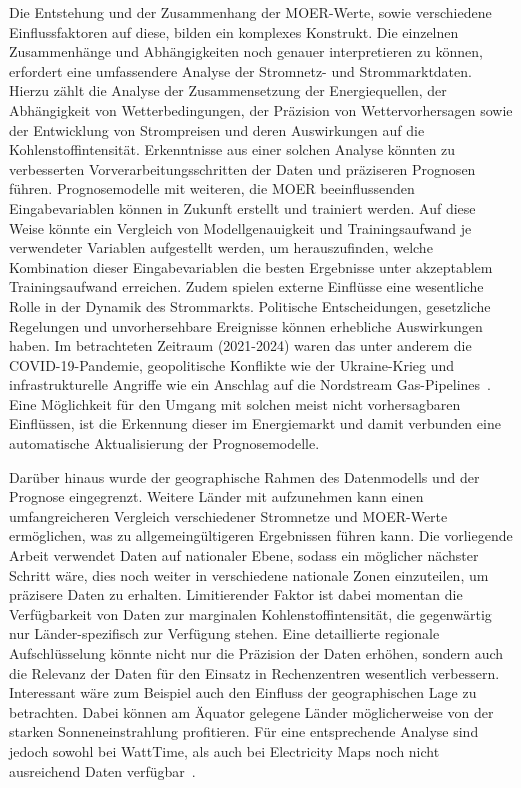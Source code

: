 Die Entstehung und der Zusammenhang der \ac{MOER}-Werte, sowie verschiedene Einflussfaktoren auf diese, bilden ein komplexes Konstrukt.
Die einzelnen Zusammenhänge und Abhängigkeiten noch genauer interpretieren zu können, erfordert eine umfassendere Analyse der Stromnetz- und Strommarktdaten.
Hierzu zählt die Analyse der Zusammensetzung der Energiequellen, der Abhängigkeit von Wetterbedingungen, der Präzision von Wettervorhersagen sowie der Entwicklung von Strompreisen und deren Auswirkungen auf die Kohlenstoffintensität.
Erkenntnisse aus einer solchen Analyse könnten zu verbesserten Vorverarbeitungsschritten der Daten und präziseren Prognosen führen.
Prognosemodelle mit weiteren, die \ac{MOER} beeinflussenden Eingabevariablen können in Zukunft erstellt und trainiert werden.
Auf diese Weise könnte ein Vergleich von Modellgenauigkeit und Trainingsaufwand je verwendeter Variablen aufgestellt werden, um herauszufinden, welche Kombination dieser Eingabevariablen die besten Ergebnisse unter akzeptablem Trainingsaufwand erreichen.
Zudem spielen externe Einflüsse eine wesentliche Rolle in der Dynamik des Strommarkts.
Politische Entscheidungen, gesetzliche Regelungen und unvorhersehbare Ereignisse können erhebliche Auswirkungen haben.
Im betrachteten Zeitraum (2021-2024) waren das unter anderem die COVID-19-Pandemie, geopolitische Konflikte wie der Ukraine-Krieg und infrastrukturelle Angriffe wie ein Anschlag auf die Nordstream Gas-Pipelines~\cite{Baumgartner.30.9.2022}.
Eine Möglichkeit für den Umgang mit solchen meist nicht vorhersagbaren Einflüssen, ist die Erkennung dieser im Energiemarkt und damit verbunden eine automatische Aktualisierung der Prognosemodelle.

Darüber hinaus wurde der geographische Rahmen des Datenmodells und der Prognose eingegrenzt.
Weitere Länder mit aufzunehmen kann einen umfangreicheren Vergleich verschiedener Stromnetze und \ac{MOER}-Werte ermöglichen, was zu allgemeingültigeren Ergebnissen führen kann.
Die vorliegende Arbeit verwendet Daten auf nationaler Ebene, sodass ein möglicher nächster Schritt wäre, dies noch weiter in verschiedene nationale Zonen einzuteilen, um präzisere Daten zu erhalten.
Limitierender Faktor ist dabei momentan die Verfügbarkeit von Daten zur marginalen Kohlenstoffintensität, die gegenwärtig nur Länder-spezifisch zur Verfügung stehen.
Eine detaillierte regionale Aufschlüsselung könnte nicht nur die Präzision der Daten erhöhen, sondern auch die Relevanz der Daten für den Einsatz in Rechenzentren wesentlich verbessern.
Interessant wäre zum Beispiel auch den Einfluss der geographischen Lage zu betrachten.
Dabei können am Äquator gelegene Länder möglicherweise von der starken Sonneneinstrahlung profitieren.
Für eine entsprechende Analyse sind jedoch sowohl bei WattTime, als auch bei Electricity Maps noch nicht ausreichend Daten verfügbar~\cite{WattTime.20230823}\cite{ElectricityMaps.20240305T20:54:29.000Z}.

